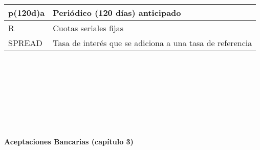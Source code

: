 \begin{spacing}{1}
\begin{center}
\begin{tabular}{ |p{2.5cm}|p{9.5cm}|}
			p(120d)a                  & Periódico (120 días) anticipado                                                     \\ \hline
			
			R                         & Cuotas seriales fijas                                                               \\ \hline
			
			SPREAD                    & Tasa de interés que se adiciona a una tasa de referencia                            \\ \hline
		\end{tabular}
	\end{center}
\end{spacing}
\ \ \
\\ \\ \\ \\ \\ \\ \\
\begin{center} \textbf {Aceptaciones Bancarias (capítulo 3)}\\ \end{center}

